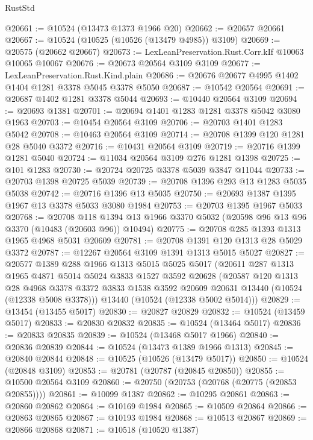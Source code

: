 \begin{lexlean}{RustStd}
\begin{coremodule}
@20661 := @10524 (@13473 @1373 @1966 @20)
@20662 := @20657 @20661
@20667 := @10524 (@10525 (@10526 (@13479 @4985)) @3109)
@20669 := @20575 (@20662 @20667)
@20673 := LexLeanPreservation.Rust.Corr.kIf @10063 @10065 @10067
@20676 := @20673 @20564 @3109 @3109
@20677 := LexLeanPreservation.Rust.Kind.plain
@20686 := @20676 @20677 @4995 @1402 @1404 @1281 @3378 @5045 @3378 @5050
@20687 := @10542 @20564
@20691 := @20687 @1402 @1281 @3378 @5044
@20693 := @10440 @20564 @3109
@20694 := @20693 @1381
@20701 := @20694 @1401 @1283 @1281 @3378 @5042 @3080 @1963
@20703 := @10454 @20564 @3109
@20706 := @20703 @1401 @1283 @5042
@20708 := @10463 @20564 @3109
@20714 := @20708 @1399 @120 @1281 @28 @5040 @3372
@20716 := @10431 @20564 @3109
@20719 := @20716 @1399 @1281 @5040
@20724 := @11034 @20564 @3109 @276 @1281 @1398
@20725 := @101 @1283
@20730 := @20724 @20725 @3378 @5039 @3847 @11044
@20733 := @20703 @1398 @20725 @5039
@20739 := @20708 @1396 @293 @13 @1283 @5035 @5038
@20742 := @20716 @1396 @13 @5035
@20750 := @20693 @1387 @1395 @1967 @13 @3378 @5033 @3080 @1984
@20753 := @20703 @1395 @1967 @5033
@20768 := @20708
    @118
    @1394
    @13
    @1966
    @3370
    @5032
    (@20598 @96 @13 @96 @3370 (@10483 (@20603 @96)) @10494)
@20775 := @20708 @285 @1393 @1313 @1965 @4968 @5031 @20609
@20781 := @20708 @1391 @120 @1313 @28 @5029 @3372
@20787 := @12267 @20564 @3109 @1391 @1313 @5015 @5027
@20827 := @20577
    @1389
    @288
    @1966
    @1313
    @5015
    @5025
    @5017
    (@20611
      @287
      @1313
      @1965
      @4871
      @5014
      @5024
      @3833
      @1527
      @3592
      @20628
      (@20587
        @120
        @1313
        @28
        @4968
        @3378
        @3372
        @3833
        @1538
        @3592
        @20609
        @20631
        @13440
        (@10524 (@12338 @5008 @3378)))
      @13440
      (@10524 (@12338 @5002 @5014)))
@20829 := @13454 (@13455 @5017)
@20830 := @20827 @20829
@20832 := @10524 (@13459 @5017)
@20833 := @20830 @20832
@20835 := @10524 (@13464 @5017)
@20836 := @20833 @20835
@20839 := @10524 (@13468 @5017 @1966)
@20840 := @20836 @20839
@20844 := @10524 (@13473 @1389 @1966 @1313)
@20845 := @20840 @20844
@20848 := @10525 (@10526 (@13479 @5017))
@20850 := @10524 (@20848 @3109)
@20853 := @20781 (@20787 (@20845 @20850))
@20855 := @10500 @20564 @3109
@20860 := @20750 (@20753 (@20768 (@20775 (@20853 @20855))))
@20861 := @10099 @1387
@20862 := @10295 @20861
@20863 := @20860 @20862
@20864 := @10169 @1984
@20865 := @10509 @20864
@20866 := @20863 @20865
@20867 := @10193 @1984
@20868 := @10513 @20867
@20869 := @20866 @20868
@20871 := @10518 (@10520 @1387)

\end{coremodule}
\end{lexlean}
